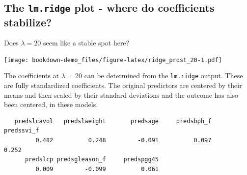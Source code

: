 \documentclass[]{book}
\newenvironment{Shaded}{\begin{snugshade}}{\end{snugshade}}
\newcommand{\KeywordTok}[1]{\textcolor[rgb]{0.13,0.29,0.53}{\textbf{#1}}}
\newcommand{\DataTypeTok}[1]{\textcolor[rgb]{0.13,0.29,0.53}{#1}}
\newcommand{\DecValTok}[1]{\textcolor[rgb]{0.00,0.00,0.81}{#1}}
\newcommand{\StringTok}[1]{\textcolor[rgb]{0.31,0.60,0.02}{#1}}
\newcommand{\OperatorTok}[1]{\textcolor[rgb]{0.81,0.36,0.00}{\textbf{#1}}}
\newcommand{\NormalTok}[1]{#1}
\theoremstyle{definition}
\theoremstyle{definition}
\theoremstyle{definition}
\theoremstyle{remark}
\begin{document}
\subsection{\texorpdfstring{The \texttt{lm.ridge} plot - where do
coefficients
stabilize?}{The lm.ridge plot - where do coefficients stabilize?}}\label{the-lm.ridge-plot---where-do-coefficients-stabilize}

Does \(\lambda = 20\) seem like a stable spot here?

\begin{Shaded}
\end{Shaded}

\texttt{[image: bookdown-demo\_files/figure-latex/ridge\_prost\_20-1.pdf]}

The coefficients at \(\lambda\) = 20 can be determined from the
\texttt{lm.ridge} output. These are fully standardized coefficients. The
original predictors are centered by their means and then scaled by their
standard deviations and the outcome has also been centered, in these
models.

\begin{Shaded}
\end{Shaded}

\begin{verbatim}
   predslcavol   predslweight       predsage     predsbph_f     predssvi_f 
         0.482          0.248         -0.091          0.097          0.252 
      predslcp predsgleason_f     predspgg45 
         0.009         -0.099          0.061 
\end{verbatim}
\end{document}
